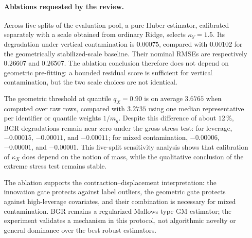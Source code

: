 \paragraph{Ablations requested by the review.}
Across five splits of the evaluation pool, a pure Huber estimator, calibrated separately with a scale obtained from ordinary Ridge, selects $\kappa_Y=1.5$. Its degradation under vertical contamination is $0.00075$, compared with $0.00102$ for the geometrically stabilized-scale baseline. Their nominal RMSEs are respectively $0.26607$ and $0.26507$. The ablation conclusion therefore does not depend on geometric pre-fitting: a bounded residual score is sufficient for vertical contamination, but the two scale choices are not identical.

The geometric threshold at quantile $q_X=0.90$ is on average $3.6765$ when computed over raw rows, compared with $3.2735$ using one median representative per identifier or quantile weights $1/m_g$. Despite this difference of about $12\,\%$, BGR degradations remain near zero under the gross stress test: for leverage, $-0.00015$, $-0.00011$, and $-0.00011$; for mixed contamination, $-0.00006$, $-0.00001$, and $-0.00001$. This five-split sensitivity analysis shows that calibration of $\kappa_X$ does depend on the notion of mass, while the qualitative conclusion of the extreme stress test remains stable.

The ablation supports the contraction--displacement interpretation: the innovation gate protects against label outliers, the geometric gate protects against high-leverage covariates, and their combination is necessary for mixed contamination. BGR remains a regularized Mallows-type GM-estimator; the experiment validates a mechanism in this protocol, not algorithmic novelty or general dominance over the best robust estimators.

